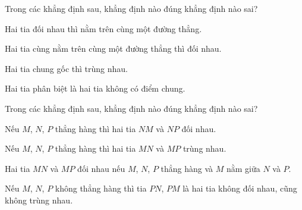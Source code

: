 \begin{bt}%
	Trong các khẳng định sau, khẳng định nào đúng khẳng định nào sai?
	\begin{enumEX}{1}
		\item  Hai tia đối nhau thì nằm trên cùng một đường thẳng.
		\item  Hai tia cùng nằm trên cùng một đường thẳng thì đối nhau.
		\item  Hai tia chung gốc thì trùng nhau.
		\item  Hai tia phân biệt là hai tia không có điểm chung.
	\end{enumEX}
\end{bt}	


\begin{bt}%
	Trong các khẳng định sau, khẳng định nào đúng khẳng định nào sai?
	\begin{enumEX}{1}
		\item  Nếu $ M $, $ N $, $ P $ thẳng hàng thì hai tia $ NM $ và $ NP $ đối nhau.
		\item  Nếu $ M $, $ N $, $ P $ thẳng hàng thì hai tia $ MN $ và $ MP $ trùng nhau.
		\item  Hai tia $ MN$ và $ MP $ đối nhau nếu $ M $, $ N $, $ P $ thẳng hàng và $ M $ nằm giữa $ N $ và $ P $.
		\item  Nếu $ M $, $ N $, $ P $ không thẳng hàng thì tia $ PN $, $ PM $ là hai tia không đối nhau, cũng không trùng nhau.
	\end{enumEX}
\end{bt}

